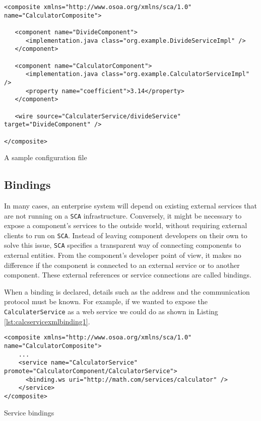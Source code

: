 \begin{listing}
\begin{verbatim}
<composite xmlns="http://www.osoa.org/xmlns/sca/1.0" name="CalculatorComposite">

   <component name="DivideComponent">
      <implementation.java class="org.example.DivideServiceImpl" />
   </component>

   <component name="CalculatorComponent">
      <implementation.java class="org.example.CalculatorServiceImpl" />
      <property name="coefficient">3.14</property>
   </component>
   
   <wire source="CalculaterService/divideService" target="DivideComponent" />

</composite>
\end{verbatim}
\caption{A sample configuration file}
\label{lst:calcservicexmlwires}
\end{listing}

\subsection{Bindings}

In many cases, an enterprise system will depend on existing external services that are not running on a \texttt{SCA} infrastructure.
Conversely, it might be necessary to expose a component's services to the outside world, without requiring external clients
to run on \texttt{SCA}. Instead of leaving component developers on their own to solve this issue, \texttt{SCA} specifies
a transparent way of connecting components to external entities. From the component's developer point of view, it makes
no difference if the component is connected to an external service or to another component. These external references or service
connections are called bindings.

When a binding is declared, details such as the address and the communication protocol must be known. For example, if we
wanted to expose the \texttt{CalculaterService} as a web service we could do as shown in Listing \ref{lst:calcservicexmlbinding1}.

\begin{listing}
\begin{verbatim}
<composite xmlns="http://www.osoa.org/xmlns/sca/1.0" name="CalculatorComposite">
    ...
    <service name="CalculatorService" promote="CalculatorComponent/CalculatorService">
      <binding.ws uri="http://math.com/services/calculator" />
    </service>
</composite>
\end{verbatim}
\caption{Service bindings}
\label{lst:calcservicexmlbinding1}
\end{listing}

